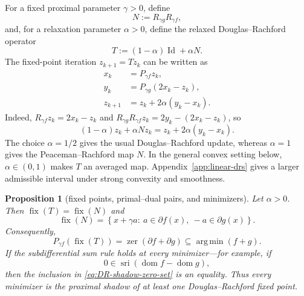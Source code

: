 \documentclass[10pt,leqno]{amsart}
\numberwithin{equation}{section}
\numberwithin{algorithm}{section}
\newtheorem{proposition}[theorem]{Proposition}
\theoremstyle{remark}
\newcommand{\Id}{\operatorname{Id}}
\newcommand{\Fix}{\operatorname{fix}}
\newcommand{\dom}{\operatorname{dom}}
\newcommand{\subd}{\partial}
\DeclareMathOperator{\argmin}{arg\,min}
\begin{document}
For a fixed proximal parameter $\gamma>0$, define
\begin{equation}
\label{eq:DR-reflection-composition}
  N:=R_{\gamma g}R_{\gamma f},
\end{equation}
and, for a relaxation parameter $\alpha>0$, define the relaxed Douglas--Rachford operator
\begin{equation}
\label{eq:DR-operator}
  T:=(1-\alpha)\Id+\alpha N.
\end{equation}
The fixed-point iteration $z_{k+1}=Tz_k$ can be written as
\begin{align}
\label{eq:DR-proxf-first-x}
  x_k&=P_{\gamma f}z_k,\tag{PROXF}\\
\label{eq:DR-proxf-first-y}
  y_k&=P_{\gamma g}(2x_k-z_k),\tag{PROXG}\\
\label{eq:DR-proxf-first-z}
  z_{k+1}&=z_k+2\alpha(y_k-x_k).
\end{align}
Indeed, $R_{\gamma f}z_k=2x_k-z_k$ and
$R_{\gamma g}R_{\gamma f}z_k=2y_k-(2x_k-z_k)$, so
\[
  (1-\alpha)z_k+\alpha Nz_k
  =z_k+2\alpha(y_k-x_k).
\]
The choice $\alpha=1/2$ gives the usual Douglas--Rachford update, whereas $\alpha=1$ gives the Peaceman--Rachford map $N$.  In the general convex setting below, $\alpha\in(0,1)$ makes $T$ an averaged map.  Appendix~\ref{app:linear-drs} gives a larger admissible interval under strong convexity and smoothness.

\begin{proposition}[fixed points, primal--dual pairs, and minimizers]
\label{prop:fixed-point-solution}
Let $\alpha>0$.  Then $\Fix(T)=\Fix(N)$ and
\begin{equation}
\label{eq:DR-fixed-point-characterization}
  \Fix(N)
  =\left\{x+\gamma a:\
  a\in\subd f(x),\ -a\in\subd g(x)\right\}.
\end{equation}
Consequently,
\begin{equation}
\label{eq:DR-shadow-zero-set}
  P_{\gamma f}(\Fix(T))
  =\operatorname{zer}(\subd f+\subd g)
  \subseteq\argmin(f+g).
\end{equation}
If the subdifferential sum rule holds at every minimizer---for example, if
\begin{equation}
\label{eq:DR-sum-rule-qualification}
  0\in\operatorname{sri}(\dom f-\dom g),
\end{equation}
then the inclusion in \eqref{eq:DR-shadow-zero-set} is an equality.  Thus every minimizer is the proximal shadow of at least one Douglas--Rachford fixed point.
\end{proposition}
\end{document}
